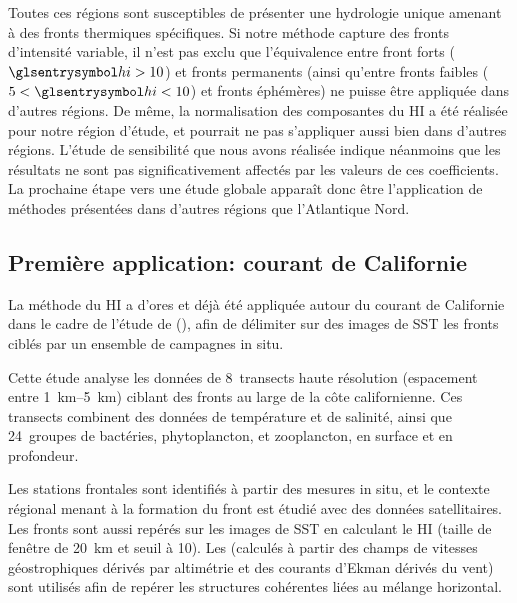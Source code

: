 \begin{figure}
  \centering
  \label{fig:global-fronts}
\end{figure}

Toutes ces régions sont susceptibles de présenter une hydrologie unique amenant à des fronts thermiques spécifiques.
Si notre méthode capture des fronts d'intensité variable, il n'est pas exclu que l'équivalence entre front forts (\(\am{hi}>10\)) et fronts permanents (ainsi qu'entre fronts faibles (\(5<\am{hi}<10\)) et fronts éphémères) ne puisse être appliquée dans d'autres régions.
De même, la normalisation des composantes du HI a été réalisée pour notre région d'étude, et pourrait ne pas s'appliquer aussi bien dans d'autres régions.
L'étude de sensibilité que nous avons réalisée indique néanmoins que les résultats  ne sont pas significativement affectés par les valeurs de ces coefficients.
La prochaine étape vers une étude globale apparaît donc être l'application de méthodes présentées dans d'autres régions que l'Atlantique Nord.

\subsection{Première application: courant de Californie}
\label{sec:cce}

La méthode du HI a d'ores et déjà été appliquée autour du courant de Californie dans le cadre de l'étude de \textcite{mangolte_2023} (), afin de délimiter sur des images de SST les fronts ciblés par un ensemble de campagnes in situ.

Cette étude analyse les données de 8~transects haute résolution (espacement entre \qtyrange[range-phrase={ et }]{1}{5}{\km}) ciblant des fronts au large de la côte californienne.
Ces transects combinent des données de température et de salinité, ainsi que 24~groupes de bactéries, phytoplancton, et zooplancton, en surface et en profondeur.

Les stations frontales sont identifiés à partir des mesures in situ, et le contexte régional menant à la formation du front est étudié avec des données satellitaires.
Les fronts sont aussi repérés sur les images de SST en calculant le HI (taille de fenêtre de \qty{20}{\km} et seuil à \num{10}).
Les   (calculés à partir des champs de vitesses géostrophiques dérivés par altimétrie et des courants d'Ekman dérivés du vent) sont utilisés afin de repérer les structures cohérentes liées au mélange horizontal.

